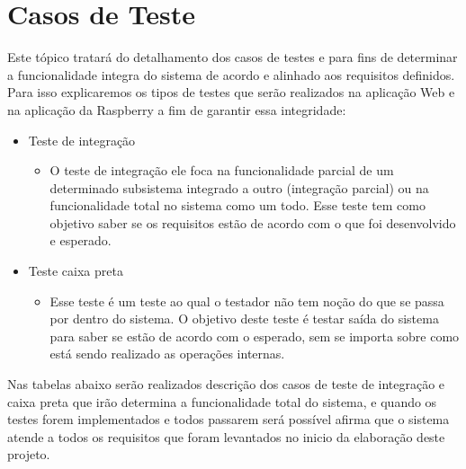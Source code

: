 \section*{Casos de Teste}

Este tópico tratará do detalhamento dos casos de testes e para fins de determinar a funcionalidade integra do sistema de acordo e alinhado aos requisitos definidos. Para isso explicaremos os tipos de testes que serão realizados na aplicação Web e na aplicação da Raspberry a fim de garantir essa integridade:

\begin{itemize}
    \item Teste de integração
        \begin{itemize}
            \item O teste de integração ele foca na funcionalidade parcial de um determinado subsistema integrado a outro (integração parcial) ou na funcionalidade total no sistema como um todo. Esse teste tem como objetivo saber se os requisitos estão de acordo com o que foi desenvolvido e esperado.
        \end{itemize}
    \item Teste caixa preta
        \begin{itemize}
            \item Esse teste é um teste ao qual o testador não tem noção do que se passa por dentro do sistema. O objetivo deste teste é testar saída do sistema para saber se estão de acordo com o esperado, sem se importa sobre como está sendo realizado as operações internas.
        \end{itemize}
\end{itemize}

Nas tabelas abaixo serão realizados descrição dos casos de teste de integração e caixa preta que irão determina a funcionalidade total do sistema, e quando os testes forem implementados e todos passarem será possível afirma que o sistema atende a todos os requisitos que foram levantados no inicio da elaboração deste projeto.

